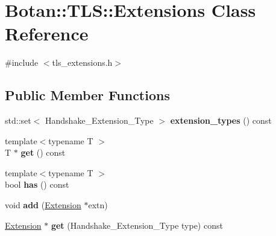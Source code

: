 \hypertarget{class_botan_1_1_t_l_s_1_1_extensions}{}\section{Botan\+:\+:T\+LS\+:\+:Extensions Class Reference}
\label{class_botan_1_1_t_l_s_1_1_extensions}


{\ttfamily \#include $<$tls\+\_\+extensions.\+h$>$}

\subsection*{Public Member Functions}
\begin{DoxyCompactItemize}
\item 
\mbox{\label{class_botan_1_1_t_l_s_1_1_extensions_a262775d5198c48674ab8de1d6b8d9075}} 
std\+::set$<$ Handshake\+\_\+\+Extension\+\_\+\+Type $>$ {\bfseries extension\+\_\+types} () const
\item 
\mbox{\label{class_botan_1_1_t_l_s_1_1_extensions_a236517e345c0d96e13ee70abcb5fe655}} 
{\footnotesize template$<$typename T $>$ }\\T $\ast$ {\bfseries get} () const
\item 
\mbox{\label{class_botan_1_1_t_l_s_1_1_extensions_afe9d5fe73cb473313f758877c3f131e3}} 
{\footnotesize template$<$typename T $>$ }\\bool {\bfseries has} () const
\item 
\mbox{\label{class_botan_1_1_t_l_s_1_1_extensions_a0eea462d742813d6fbfd50b09cbd28cd}} 
void {\bfseries add} (\hyperlink{class_botan_1_1_t_l_s_1_1_extension}{Extension} $\ast$extn)
\item 
\mbox{\label{class_botan_1_1_t_l_s_1_1_extensions_a072605270a7281e890afba9043ac038e}} 
\hyperlink{class_botan_1_1_t_l_s_1_1_extension}{Extension} $\ast$ {\bfseries get} (Handshake\+\_\+\+Extension\+\_\+\+Type type) const
\item 
\mbox{\label{class_botan_1_1_t_l_s_1_1_extensions_a5a6d7cb985c833c74281f4558d71b693}} 

\end{DoxyCompactItemize}
